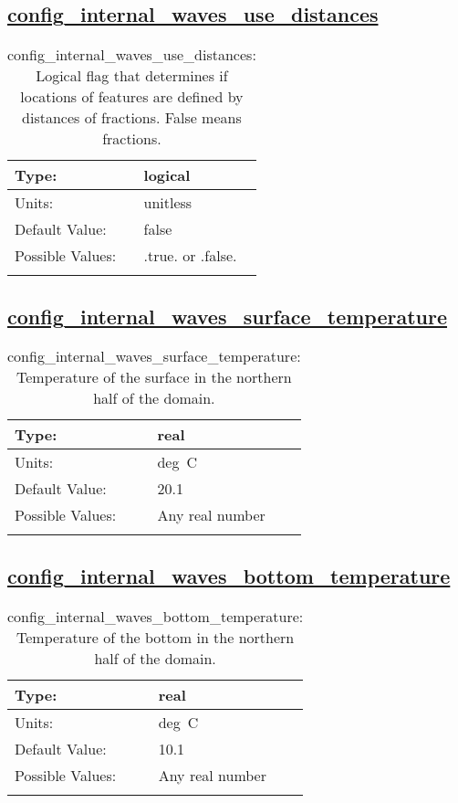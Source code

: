 \subsection[config\_internal\_waves\_use\_distances]{\hyperref[sec:nm_tab_internal_waves]{config\_internal\_waves\_use\_distances}}
\label{subsec:nm_sec_config_internal_waves_use_distances}
\begin{center}
\begin{longtable}{| p{2.0in} || p{4.0in} |}
    \hline
    Type: & logical \\
    \hline
    Units: & \si{unitless} \\
    \hline
    Default Value: & false \\
    \hline
    Possible Values: & .true. or .false. \\
    \hline
    \caption{config\_internal\_waves\_use\_distances: Logical flag that determines if locations of features are defined by distances of fractions. False means fractions.}
\end{longtable}
\end{center}
\subsection[config\_internal\_waves\_surface\_temperature]{\hyperref[sec:nm_tab_internal_waves]{config\_internal\_waves\_surface\_temperature}}
\label{subsec:nm_sec_config_internal_waves_surface_temperature}
\begin{center}
\begin{longtable}{| p{2.0in} || p{4.0in} |}
    \hline
    Type: & real \\
    \hline
    Units: & \si{deg.C} \\
    \hline
    Default Value: & 20.1 \\
    \hline
    Possible Values: & Any real number \\
    \hline
    \caption{config\_internal\_waves\_surface\_temperature: Temperature of the surface in the northern half of the domain.}
\end{longtable}
\end{center}
\subsection[config\_internal\_waves\_bottom\_temperature]{\hyperref[sec:nm_tab_internal_waves]{config\_internal\_waves\_bottom\_temperature}}
\label{subsec:nm_sec_config_internal_waves_bottom_temperature}
\begin{center}
\begin{longtable}{| p{2.0in} || p{4.0in} |}
    \hline
    Type: & real \\
    \hline
    Units: & \si{deg.C} \\
    \hline
    Default Value: & 10.1 \\
    \hline
    Possible Values: & Any real number \\
    \hline
    \caption{config\_internal\_waves\_bottom\_temperature: Temperature of the bottom in the northern half of the domain.}
\end{longtable}
\end{center}
